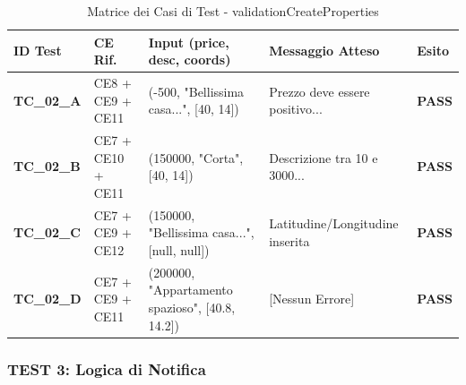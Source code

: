 \documentclass{article}
\begin{document}
\begin{table}[H]
    \centering
    \caption{Matrice dei Casi di Test - validationCreateProperties}
    \begin{tabularx}{\textwidth}{|l|l|X|l|l|}
        \hline
        \rowcolor{DarkBlue}
        \textbf{\color{white}ID Test} & \textbf{\color{white}CE Rif.} & \textbf{\color{white}Input (price, desc, coords)} & \textbf{\color{white}Messaggio Atteso} & \textbf{\color{white}Esito}      \\ \hline
        \textbf{TC\_02\_A}            & CE8 + CE9 + CE11              & (-500, "Bellissima casa...", [40, 14])            & Prezzo deve essere positivo...         & {\color{codegreen}\textbf{PASS}} \\ \hline
        \textbf{TC\_02\_B}            & CE7 + CE10 + CE11             & (150000, "Corta", [40, 14])                       & Descrizione tra 10 e 3000...           & {\color{codegreen}\textbf{PASS}} \\ \hline
        \textbf{TC\_02\_C}            & CE7 + CE9 + CE12              & (150000, "Bellissima casa...", [null, null])      & Latitudine/Longitudine inserita        & {\color{codegreen}\textbf{PASS}} \\ \hline
        \textbf{TC\_02\_D}            & CE7 + CE9 + CE11              & (200000, "Appartamento spazioso", [40.8, 14.2])   & [Nessun Errore]                        & {\color{codegreen}\textbf{PASS}} \\ \hline
    \end{tabularx}
\end{table}


\newpage
\subsubsection{TEST 3: Logica di Notifica}
\end{document}
